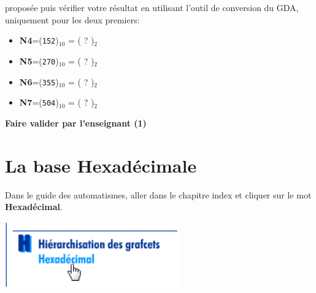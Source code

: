 \documentclass{article}
\begin{document}
\begin{enumerate}
		proposée puis vérifier votre résultat en utilisant l'outil de conversion du GDA, uniquement pour les
		deux premiers:
		\begin{itemize}
			\item \textbf{N4}=(\texttt{152})$_{10}$ = ( ? )$_{2}$\\
\vspace{1em}
\begin{Form}
	\TextField[name=r104,width=\linewidth,height=2.5em,multiline=true,default=N4=]{}
\end{Form}
			\item \textbf{N5}=(\texttt{270})$_{10}$ = ( ? )$_{2}$\\
\vspace{1em}
\begin{Form}
	\TextField[name=r105,width=\linewidth,height=2.5em,multiline=true,default=N5=]{}
\end{Form}
			\item \textbf{N6}=(\texttt{355})$_{10}$ = ( ? )$_{2}$\\
\vspace{1em}
\begin{Form}
	\TextField[name=r106,width=\linewidth,height=2.5em,multiline=true,default=N6=]{}
\end{Form}
			\item \textbf{N7}=(\texttt{504})$_{10}$ = ( ? )$_{2}$\\
\vspace{1em}
\begin{Form}
	\TextField[name=r107,width=\linewidth,height=2.5em,multiline=true,default=N7=]{}
\end{Form}
		\end{itemize}
\end{enumerate}

\begin{center}
	\vspace{2em}
	\Large
	\textbf{Faire valider par l'enseignant (1)}
\end{center}

\section{La base Hexadécimale}
Dans le guide des automatismes, aller dans le chapitre \og{}index\fg{} et cliquer sur le mot \textbf{Hexadécimal}.

\begin{center}
	\includegraphics[width=.3\linewidth]{./figures/gda2.png}
\end{center}
\end{document}
